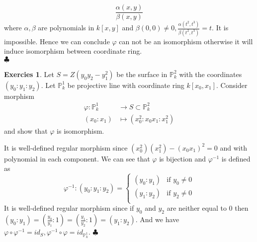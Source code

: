 \documentclass[12pt,a4paper]{article}
\theoremstyle{definition}
\newtheorem{exer}{Exercies}[section]
\newcommand*{\qeds}{\hfill\ensuremath{\clubsuit}}
\begin{document}
\[
\frac{\alpha(x,y)}{\beta(x,y)}
\]
where $\alpha ,\beta$ are polynomials in $k[x,y]$ and $\beta(0,0) \neq 0, \frac{\alpha(t^2,t^3)}{\beta(t^2,t^3)} = t$. It is impossible.
Hence we can conclude $\varphi$ can not be an isomorphism otherwise it will induce isomorphism between coordinate ring. \\ \qeds
\begin{exer}
	Let $S= Z(y_0 y_2 - y_1^2)$ be the surface in $\mathbb{P}^2_k$ with the coordinates $(y_0:y_1:y_2)$. Let $\mathbb{P}^1_k$ be projective line with coordinate ring $k[x_0,x_1]$. Consider morphism \[
	\begin{aligned}
	\varphi: \mathbb{P}^1_k &\to S \subset \mathbb{P}^2_k\\
	(x_0:x_1) &\mapsto (x_0^2: x_0x_1: x_1^2)
	\end{aligned}\] and show that $\varphi$ is isomorphism.
\end{exer}
It is well-defined regular morphism since $(x_0^2)(x_1^2) - (x_0 x_1)^2=0$ and with polynomial in each component. We can see that $\varphi$ is bijection and $\varphi^{-1}$ is defined as
\[
\varphi^{-1} \colon (y_0:y_1:y_2) =\begin{cases}
(y_0: y_1)& \text{if } y_0 \neq 0\\
(y_1: y_2)& \text{if } y_2 \neq 0\\
\end{cases} 
\]
It is well-defined regular morphism since if $y_0$ and $y_2$ are neither equal to $0$ then $(y_0: y_1) = (\frac{y_0}{y_1}:1) = (\frac{y_1}{y_2}:1) = (y_1:y_2)$. And we have $\varphi \circ \varphi^{-1} = id_{S}, \varphi^{-1} \circ \varphi = id_{\mathbb{P}^1_k}$. \qeds
\end{document}
